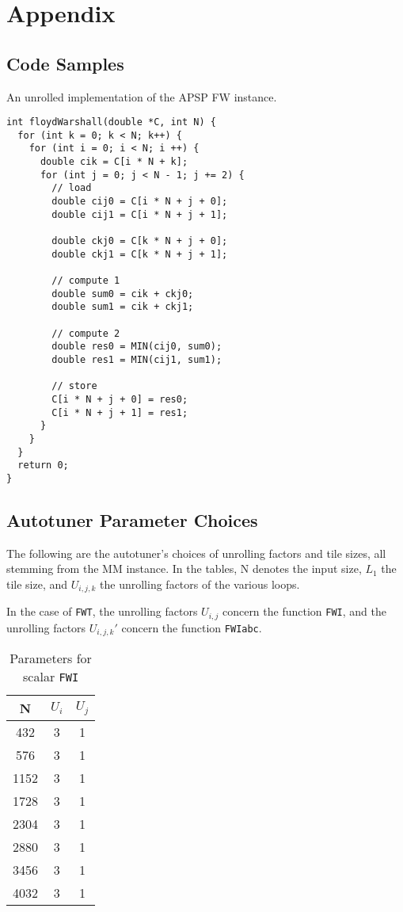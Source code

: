 \newpage

\appendix

\section{Appendix}

\subsection{Code Samples}\label{app:code}
\begin{listing}[h!]
\caption{An unrolled implementation of the APSP FW instance.}\label{lst:unrolled}
\begin{verbatim}
int floydWarshall(double *C, int N) {
  for (int k = 0; k < N; k++) {
    for (int i = 0; i < N; i ++) {
      double cik = C[i * N + k];
      for (int j = 0; j < N - 1; j += 2) {
        // load
        double cij0 = C[i * N + j + 0];
        double cij1 = C[i * N + j + 1];

        double ckj0 = C[k * N + j + 0];
        double ckj1 = C[k * N + j + 1];

        // compute 1
        double sum0 = cik + ckj0;
        double sum1 = cik + ckj1;

        // compute 2
        double res0 = MIN(cij0, sum0);
        double res1 = MIN(cij1, sum1);

        // store
        C[i * N + j + 0] = res0;
        C[i * N + j + 1] = res1;
      }
    }
  }
  return 0;
}
\end{verbatim}
\end{listing}

\subsection{Autotuner Parameter Choices}
The following are the autotuner's choices of unrolling factors and tile sizes, all stemming from the MM instance.
In the tables, N denotes the input size, $L_1$ the tile size, and $U_{i, j, k}$ the unrolling factors of the various loops.

In the case of \texttt{FWT}, the unrolling factors $U_{i, j}$ concern the function \texttt{FWI}, and the unrolling factors $U_{i, j, k}'$ concern the function \texttt{FWIabc}.

\begin{table}[h]
\centering
\begin{tabular}{|c|c|c|}
\hline
N & $U_i$ & $U_j$ \\
\hline
432 & 3 & 1\\
576 & 3 & 1\\
1152 & 3 & 1\\
1728 & 3 & 1\\
2304 & 3 & 1\\
2880 & 3 & 1\\
3456 & 3 & 1\\
4032 & 3 & 1\\
\hline
\end{tabular}
\caption{Parameters for scalar \texttt{FWI}}
\end{table}

